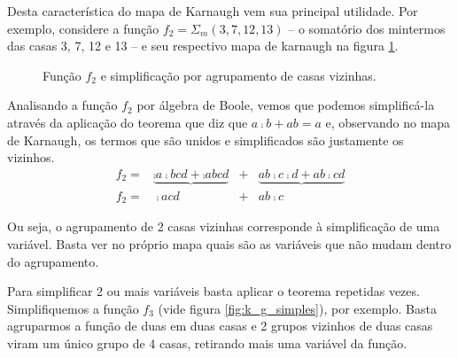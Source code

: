 Desta característica do mapa de Karnaugh vem sua principal utilidade. Por exemplo, considere a função $f_2=\Sigma_m(3,7,12,13)$ -- o somatório dos mintermos das casas 3, 7, 12 e 13 -- e seu respectivo mapa de karnaugh na figura \ref{fig:k_f2}.

\begin{figure}[hbt]
	\centering
	\caption{Função $f_2$ e simplificação por agrupamento de casas vizinhas.}
	\label{fig:k_f2}
\end{figure}

Analisando a função $f_2$ por álgebra de Boole, vemos que podemos simplificá-la através da aplicação do teorema que diz que $a\comp{b}+ab=a$ e, observando no mapa de Karnaugh, os termos que são unidos e simplificados são justamente os vizinhos.
\begin{equation*}
\begin{matrix}
f_2=&\!\!\!\underbrace{\comp{a}\comp{b}cd+\comp{a}bcd}&\!\!\!\!+&\!\!\!\!\underbrace{ab\comp{c}\comp{d}+ab\comp{c}d}\\
f_2=&\!\!\comp{a}cd&\!\!\!\!+&ab\comp{c}
\end{matrix}
\end{equation*}

Ou seja, o agrupamento de 2 casas vizinhas corresponde à simplificação de uma variável. Basta ver no próprio mapa quais são as variáveis que não mudam dentro do agrupamento.

Para simplificar 2 ou mais variáveis basta aplicar o teorema repetidas vezes. Simplifiquemos a função $f_3$ (vide figura \ref{fig:k_g_simples}), por exemplo. Basta agruparmos a função de duas em duas casas e 2 grupos vizinhos de duas casas viram um único grupo de 4 casas, retirando mais uma variável da função.

